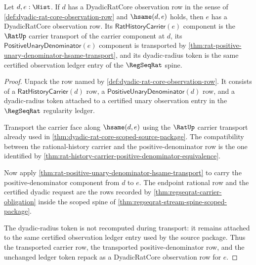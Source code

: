 \begin{theorem}
\label{thm:dyadic-rat-core-observation-row-hsame-transport}
Let $d,e:\Hist$. If $d$ has a DyadicRatCore observation row in the sense of
\autoref{def:dyadic-rat-core-observation-row} and $\hsame(d,e)$ holds, then
$e$ has a DyadicRatCore observation row. Its $\mathsf{RatHistoryCarrier}(e)$
component is the $\RatUp$ carrier transport of the carrier component at $d$,
its $\mathsf{PositiveUnaryDenominator}(e)$ component is transported by
\autoref{thm:rat-positive-unary-denominator-hsame-transport}, and its
dyadic-radius token is the same certified observation ledger entry of the
$\RegSeqRat$ spine.
\end{theorem}
\begin{proof}
Unpack the row named by
\autoref{def:dyadic-rat-core-observation-row}. It consists of a
$\mathsf{RatHistoryCarrier}(d)$ row, a
$\mathsf{PositiveUnaryDenominator}(d)$ row, and a dyadic-radius token attached
to a certified unary observation entry in the $\RegSeqRat$ regularity ledger.

Transport the carrier face along $\hsame(d,e)$ using the $\RatUp$ carrier
transport already used in
\autoref{thm:dyadic-rat-core-scoped-source-package}. The compatibility between
the rational-history carrier and the positive-denominator row is the one
identified by
\autoref{thm:rat-history-carrier-positive-denominator-equivalence}.

Now apply
\autoref{thm:rat-positive-unary-denominator-hsame-transport} to carry the
positive-denominator component from $d$ to $e$. The endpoint rational row and
the certified dyadic request are the rows recorded by
\autoref{thm:regseqrat-carrier-obligation} inside the scoped spine of
\autoref{thm:regseqrat-stream-spine-scoped-package}.

The dyadic-radius token is not recomputed during transport: it remains attached
to the same certified observation ledger entry used by the source package.
Thus the transported carrier row, the transported positive-denominator row,
and the unchanged ledger token repack as a DyadicRatCore observation row for
$e$.
\end{proof}

